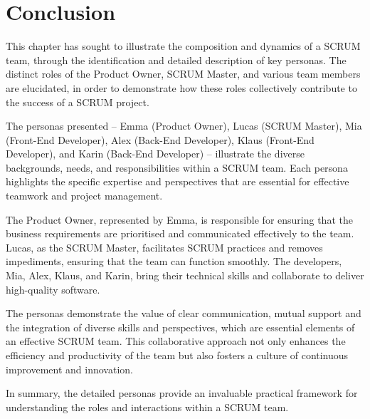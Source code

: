 \section{Conclusion}
This chapter has sought to illustrate the composition and dynamics of a \ac{SCRUM} team, through the identification and detailed description of key personas. The distinct roles of the Product Owner, \ac{SCRUM} Master, and various team members are elucidated, in order to demonstrate how these roles collectively contribute to the success of a \ac{SCRUM} project.

The personas presented – Emma (Product Owner), Lucas (\ac{SCRUM} Master), Mia (Front-End Developer), Alex (Back-End Developer), Klaus (Front-End Developer), and Karin (Back-End Developer) – illustrate the diverse backgrounds, needs, and responsibilities within a \ac{SCRUM} team. Each persona highlights the specific expertise and perspectives that are essential for effective teamwork and project management.

The Product Owner, represented by Emma, is responsible for ensuring that the business requirements are prioritised and communicated effectively to the team. Lucas, as the \ac{SCRUM} Master, facilitates \ac{SCRUM} practices and removes impediments, ensuring that the team can function smoothly. The developers, Mia, Alex, Klaus, and Karin, bring their technical skills and collaborate to deliver high-quality software.

The personas demonstrate the value of clear communication, mutual support and the integration of diverse skills and perspectives, which are essential elements of an effective \ac{SCRUM} team. This collaborative approach not only enhances the efficiency and productivity of the team but also fosters a culture of continuous improvement and innovation.

In summary, the detailed personas provide an invaluable practical framework for understanding the roles and interactions within a \ac{SCRUM} team.